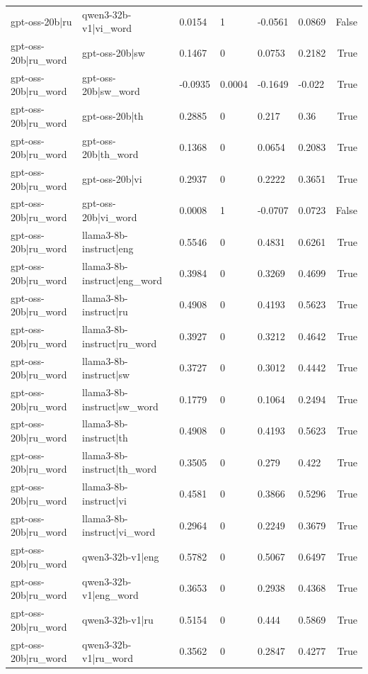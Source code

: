 \begin{table}
\begin{tabular}{llllllr}
gpt-oss-20b|ru & qwen3-32b-v1|vi_word & 0.0154 & 1 & -0.0561 & 0.0869 & False \\
gpt-oss-20b|ru_word & gpt-oss-20b|sw & 0.1467 & 0 & 0.0753 & 0.2182 & True \\
gpt-oss-20b|ru_word & gpt-oss-20b|sw_word & -0.0935 & 0.0004 & -0.1649 & -0.022 & True \\
gpt-oss-20b|ru_word & gpt-oss-20b|th & 0.2885 & 0 & 0.217 & 0.36 & True \\
gpt-oss-20b|ru_word & gpt-oss-20b|th_word & 0.1368 & 0 & 0.0654 & 0.2083 & True \\
gpt-oss-20b|ru_word & gpt-oss-20b|vi & 0.2937 & 0 & 0.2222 & 0.3651 & True \\
gpt-oss-20b|ru_word & gpt-oss-20b|vi_word & 0.0008 & 1 & -0.0707 & 0.0723 & False \\
gpt-oss-20b|ru_word & llama3-8b-instruct|eng & 0.5546 & 0 & 0.4831 & 0.6261 & True \\
gpt-oss-20b|ru_word & llama3-8b-instruct|eng_word & 0.3984 & 0 & 0.3269 & 0.4699 & True \\
gpt-oss-20b|ru_word & llama3-8b-instruct|ru & 0.4908 & 0 & 0.4193 & 0.5623 & True \\
gpt-oss-20b|ru_word & llama3-8b-instruct|ru_word & 0.3927 & 0 & 0.3212 & 0.4642 & True \\
gpt-oss-20b|ru_word & llama3-8b-instruct|sw & 0.3727 & 0 & 0.3012 & 0.4442 & True \\
gpt-oss-20b|ru_word & llama3-8b-instruct|sw_word & 0.1779 & 0 & 0.1064 & 0.2494 & True \\
gpt-oss-20b|ru_word & llama3-8b-instruct|th & 0.4908 & 0 & 0.4193 & 0.5623 & True \\
gpt-oss-20b|ru_word & llama3-8b-instruct|th_word & 0.3505 & 0 & 0.279 & 0.422 & True \\
gpt-oss-20b|ru_word & llama3-8b-instruct|vi & 0.4581 & 0 & 0.3866 & 0.5296 & True \\
gpt-oss-20b|ru_word & llama3-8b-instruct|vi_word & 0.2964 & 0 & 0.2249 & 0.3679 & True \\
gpt-oss-20b|ru_word & qwen3-32b-v1|eng & 0.5782 & 0 & 0.5067 & 0.6497 & True \\
gpt-oss-20b|ru_word & qwen3-32b-v1|eng_word & 0.3653 & 0 & 0.2938 & 0.4368 & True \\
gpt-oss-20b|ru_word & qwen3-32b-v1|ru & 0.5154 & 0 & 0.444 & 0.5869 & True \\
gpt-oss-20b|ru_word & qwen3-32b-v1|ru_word & 0.3562 & 0 & 0.2847 & 0.4277 & True \\

\end{tabular}
\end{table}
